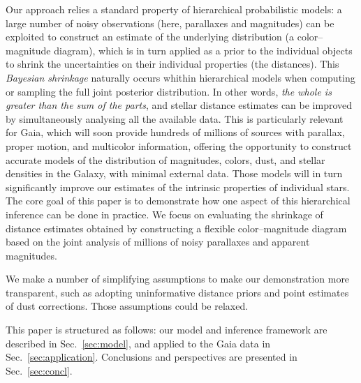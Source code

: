 \documentclass[manuscript, letterpaper]{aastex6}
\makeatletter
\let\origsection\section
\renewcommand\section{\@ifstar{\starsection}{\nostarsection}}
\newcommand\nostarsection[1]{\sectionprelude\origsection{#1}}
\newcommand\starsection[1]{\sectionprelude\origsection*{#1}}
\newcommand\sectionprelude{\vspace{1em}}
\newcommand{\secref}[1]{{\xspace}Sec.~\ref{#1}}
\makeatother
\begin{document}
Our approach relies a standard property of hierarchical probabilistic models: a large number of noisy observations (here, parallaxes and magnitudes) can be exploited to construct an estimate of the underlying distribution (a color--magnitude diagram), which is in turn applied as a prior to the individual objects to shrink the uncertainties on their individual properties (the distances).
This \textit{Bayesian shrinkage} naturally occurs whithin hierarchical models when computing or sampling the full joint posterior distribution. 
In other words, \textit{the whole is greater than the sum of the parts}, and stellar distance estimates can be improved by simultaneously analysing all the available data.
This is particularly relevant for Gaia, which will soon provide hundreds of millions of sources with parallax, proper motion, and multicolor information, offering the opportunity to construct accurate models of the distribution of magnitudes, colors, dust, and stellar densities in the Galaxy, with minimal external data. 
Those models will in turn significantly improve our estimates of the intrinsic properties of individual stars.
The core goal of this paper is to demonstrate how one aspect of this hierarchical inference can be done in practice. 
We focus on evaluating the shrinkage of distance estimates obtained by constructing a flexible color--magnitude diagram based on the joint analysis of millions of noisy parallaxes and apparent magnitudes.

We make a number of simplifying assumptions to make our demonstration more transparent, such as adopting uninformative distance priors and point estimates of dust corrections. 
Those assumptions could be relaxed. 

This paper is structured as follows: our model and inference framework are described in \secref{sec:model}, and applied to the Gaia data in \secref{sec:application}. 
Conclusions and perspectives are presented in \secref{sec:concl}.

\newpage
\section{Model}\label{sec:model}
\end{document}
